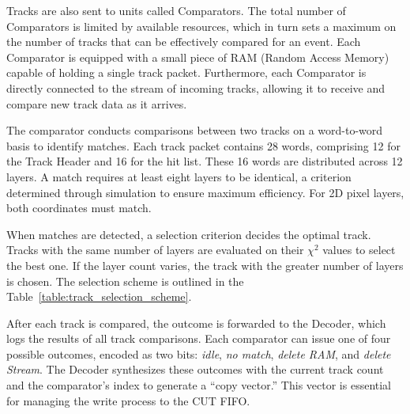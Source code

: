 Tracks are also sent to units called Comparators. The total number of Comparators is limited by available resources, which in turn sets a maximum on the number of tracks that can be effectively compared for an event. Each Comparator is equipped with a small piece of RAM (Random Access Memory) capable of holding a single track packet. Furthermore, each Comparator is directly connected to the stream of incoming tracks, allowing it to receive and compare new track data as it arrives.

The comparator conducts comparisons between two tracks on a word-to-word basis to identify matches. Each track packet contains 28 words, comprising 12 for the Track Header and 16 for the hit list. These 16 words are distributed across 12 layers. A match requires at least eight layers to be identical, a criterion determined through simulation to ensure maximum efficiency. For 2D pixel layers, both coordinates must match.

When matches are detected, a selection criterion decides the optimal track. Tracks with the same number of layers are evaluated on their \(\chi^2\) values to select the best one. If the layer count varies, the track with the greater number of layers is chosen. The selection scheme is outlined in the Table~\ref{table:track_selection_scheme}.

\begin{table}[ht]
\centering
{}
\caption{Selection scheme for matching tracks.}
\label{table:track_selection_scheme}
\end{table}

After each track is compared, the outcome is forwarded to the Decoder, which logs the results of all track comparisons. Each comparator can issue one of four possible outcomes, encoded as two bits: \textit{idle}, \textit{no match}, \textit{delete RAM}, and \textit{delete Stream}. The Decoder synthesizes these outcomes with the current track count and the comparator's index to generate a ``copy vector.'' This vector is essential for managing the write process to the CUT FIFO.

